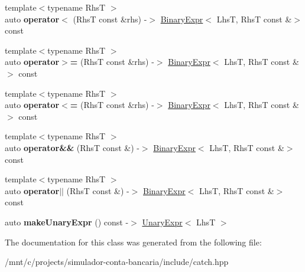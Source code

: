 \begin{DoxyCompactItemize}
\item 
\mbox{\label{classCatch_1_1ExprLhs_a55284221df2edb3542e765c87b5691b9}} 
{\footnotesize template$<$typename RhsT $>$ }\\auto {\bfseries operator$<$} (RhsT const \&rhs) -\/$>$ \hyperlink{classCatch_1_1BinaryExpr}{Binary\+Expr}$<$ LhsT, RhsT const \&$>$ const
\item 
\mbox{\label{classCatch_1_1ExprLhs_aff594ae5b957105c517a6257d2e730f0}} 
{\footnotesize template$<$typename RhsT $>$ }\\auto {\bfseries operator$>$=} (RhsT const \&rhs) -\/$>$ \hyperlink{classCatch_1_1BinaryExpr}{Binary\+Expr}$<$ LhsT, RhsT const \&$>$ const
\item 
\mbox{\label{classCatch_1_1ExprLhs_a6bd8a22c1a7fe2f66d71d7196f20af4f}} 
{\footnotesize template$<$typename RhsT $>$ }\\auto {\bfseries operator$<$=} (RhsT const \&rhs) -\/$>$ \hyperlink{classCatch_1_1BinaryExpr}{Binary\+Expr}$<$ LhsT, RhsT const \&$>$ const
\item 
\mbox{\label{classCatch_1_1ExprLhs_a5d85cdd34a136c37fa5e5283c2ff54d5}} 
{\footnotesize template$<$typename RhsT $>$ }\\auto {\bfseries operator\&\&} (RhsT const \&) -\/$>$ \hyperlink{classCatch_1_1BinaryExpr}{Binary\+Expr}$<$ LhsT, RhsT const \&$>$ const
\item 
\mbox{\label{classCatch_1_1ExprLhs_a33e5f813f5c236b9b77d977c04266f4d}} 
{\footnotesize template$<$typename RhsT $>$ }\\auto {\bfseries operator$\vert$$\vert$} (RhsT const \&) -\/$>$ \hyperlink{classCatch_1_1BinaryExpr}{Binary\+Expr}$<$ LhsT, RhsT const \&$>$ const
\item 
\mbox{\label{classCatch_1_1ExprLhs_ab68bd6d5d3ae21b7fba9010150fba95d}} 
auto {\bfseries make\+Unary\+Expr} () const -\/$>$ \hyperlink{classCatch_1_1UnaryExpr}{Unary\+Expr}$<$ LhsT $>$
\end{DoxyCompactItemize}


The documentation for this class was generated from the following file\+:\begin{DoxyCompactItemize}
\item 
/mnt/c/projects/simulador-\/conta-\/bancaria/include/catch.\+hpp\end{DoxyCompactItemize}
